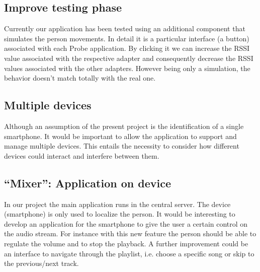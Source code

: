 \documentclass[conference]{./IEEEtran}
\begin{document}
\subsection{Improve testing phase}
Currently our application has been tested using an additional component that simulates the person movements. In detail it is a particular interface (a button) associated with each Probe application. By clicking it we can increase the RSSI value associated with the respective adapter and consequently decrease the RSSI values associated with the other adapters. However being only a simulation, the behavior doesn't match totally with the real one.  
\subsection{Multiple devices}
Although an assumption of the present project is the identification of a single smartphone. It would be important to allow the application to support and manage multiple devices. This entails the necessity to consider how different devices could interact and interfere between them.       
\subsection{``Mixer'': Application on device}
In our project the main application runs in the central server. The device (smartphone) is only used to localize the person. It would be interesting to develop an application for the smartphone to give the user a certain control on the audio stream. For instance with this new feature the person should be able to regulate the volume and to stop the playback. A further improvement could be an interface to navigate through the playlist, i.e. choose a specific song or skip to the previous/next track.  











\end{document}

